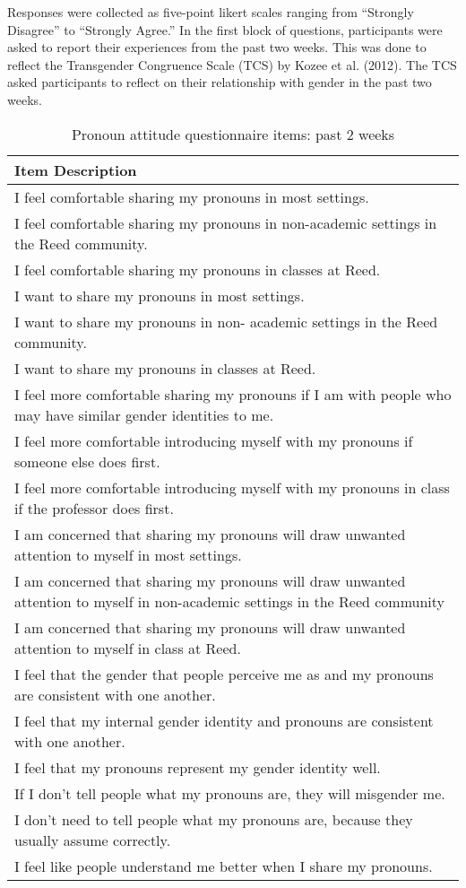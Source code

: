 \documentclass[12pt,twoside]{reedthesis}
\begin{document}
Responses were collected as five-point likert scales ranging from ``Strongly Disagree'' to ``Strongly Agree.'' In the first block of questions, participants were asked to report their experiences from the past two weeks. This was done to reflect the Transgender Congruence Scale (TCS) by Kozee et al. (2012). The TCS asked participants to reflect on their relationship with gender in the past two weeks.
\begin{table}

\caption{\label{tab:unnamed-chunk-1}Pronoun attitude questionnaire items: past 2 weeks}
\centering
\begin{tabular}[t]{l}
\hline
Item Description\\
\hline
I feel comfortable sharing my pronouns in most settings.\\
\hline
I feel comfortable sharing my pronouns in non-academic settings in the Reed community.\\
\hline
I feel comfortable sharing my pronouns in classes at Reed.\\
\hline
I want to share my pronouns in most settings.\\
\hline
I want to share my pronouns in non- academic settings in the Reed community.\\
\hline
I want to share my pronouns in classes at Reed.\\
\hline
I feel more comfortable sharing my pronouns if I am with people who may have similar gender identities to me.\\
\hline
I feel more comfortable introducing myself with my pronouns if someone else does first.\\
\hline
I feel more comfortable introducing myself with my pronouns in class if the professor does first.\\
\hline
I am concerned that sharing my pronouns will draw unwanted attention to myself in most settings.\\
\hline
I am concerned that sharing my pronouns will draw unwanted attention to myself in non-academic settings in the Reed community\\
\hline
I am concerned that sharing my pronouns will draw unwanted attention to myself in class at Reed.\\
\hline
I feel that the gender that people perceive me as and my pronouns are consistent with one another.\\
\hline
I feel that my internal gender identity and pronouns are consistent with one another.\\
\hline
I feel that my pronouns represent my gender identity well.\\
\hline
If I don’t tell people what my pronouns are, they will misgender me.\\
\hline
I don’t need to tell people what my pronouns are, because they usually assume correctly.\\
\hline
I feel like people understand me better when I share my pronouns.\\
\hline
\end{tabular}
\end{table}
\end{document}

